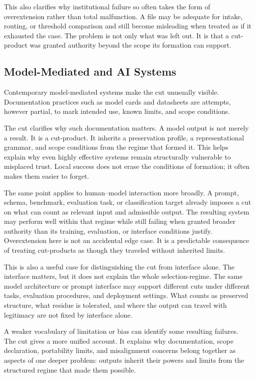 \documentclass[11pt]{article}
\begin{document}
This also clarifies why institutional failure so often takes the form of overextension rather than total malfunction. A file may be adequate for intake, routing, or threshold comparison and still become misleading when treated as if it exhausted the case. The problem is not only what was left out. It is that a cut-product was granted authority beyond the scope its formation can support.

\subsection{Model-Mediated and AI Systems}

Contemporary model-mediated systems make the cut unusually visible. Documentation practices such as model cards and datasheets are attempts, however partial, to mark intended use, known limits, and scope conditions. \cite{mitchell_model_cards,gebru_datasheets,nist_explainable_ai}

The cut clarifies why such documentation matters. A model output is not merely a result. It is a cut-product. It inherits a preservation profile, a representational grammar, and scope conditions from the regime that formed it. This helps explain why even highly effective systems remain structurally vulnerable to misplaced trust. Local success does not erase the conditions of formation; it often makes them easier to forget.

The same point applies to human--model interaction more broadly. A prompt, schema, benchmark, evaluation task, or classification target already imposes a cut on what can count as relevant input and admissible output. The resulting system may perform well within that regime while still failing when granted broader authority than its training, evaluation, or interface conditions justify. Overextension here is not an accidental edge case. It is a predictable consequence of treating cut-products as though they traveled without inherited limits.

This is also a useful case for distinguishing the cut from interface alone. The interface matters, but it does not explain the whole selection-regime. The same model architecture or prompt interface may support different cuts under different tasks, evaluation procedures, and deployment settings. What counts as preserved structure, what residue is tolerated, and where the output can travel with legitimacy are not fixed by interface alone.

A weaker vocabulary of limitation or bias can identify some resulting failures. The cut gives a more unified account. It explains why documentation, scope declaration, portability limits, and misalignment concerns belong together as aspects of one deeper problem: outputs inherit their powers and limits from the structured regime that made them possible.
\end{document}
